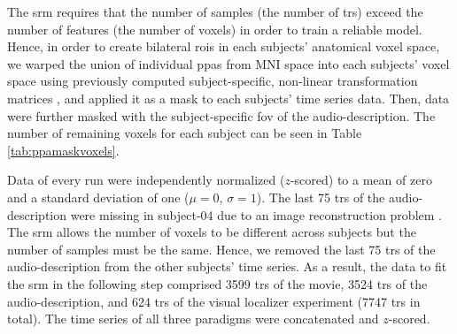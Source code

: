 



The \ac{srm} requires that the number of samples (the number of \acp{tr}) exceed
the number of features (the number of voxels) in order to train a reliable
model.
Hence, in order to create bilateral \acp{roi} in each subjects' anatomical voxel
space, we warped the union of individual \acp{ppa}
\citep[s.][]{haeusler2022processing} from MNI space into each subjects' voxel
space using previously computed subject-specific, non-linear transformation
matrices
\citep[][\href{https://github.com/psychoinformatics-de/studyforrest-data-templatetransforms
}{\url{github.com/psychoinformatics-de/studyforrest-data-templatetransforms}}]{hanke2014audiomovie},
and applied it as a mask to each subjects' time series data.
Then, data were further masked with the subject-specific \ac{fov} of the
audio-description.
%
The number of remaining voxels for each subject can be seen in Table
\ref{tab:ppamaskvoxels}.






Data of every run were independently normalized ($z$-scored) to a mean of zero
and a standard deviation of one ($\mu=0$, $\sigma=1$).
%
The last 75 \acp{tr} of the audio-description were missing in subject-04 due to
an image reconstruction problem \citep[s.][]{hanke2014audiomovie}.
%
The \ac{srm} allows the number of voxels to be different across subjects but the
number of samples must be the same.
%
Hence, we removed the last 75 \acp{tr} of the audio-description from the other
subjects' time series.
As a result, the data to fit the \ac{srm} in the following step comprised 3599
\acp{tr} of the movie, 3524 \acp{tr} of the audio-description, and 624 \acp{tr}
of the visual localizer experiment (7747 \acp{tr} in total).
The time series of all three paradigms were concatenated and $z$-scored.

